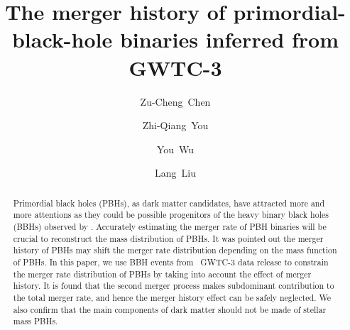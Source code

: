 \documentclass[
reprint,           %
superscriptaddress,%
amsmath,           %
amssymb,           %
aps,               %
prd,               %
notitlepage,       %
longbibliography,  %
floatfix,          %
showkeys,          %
]{revtex4-1}
\begin{document}
	
\title{The merger history of primordial-black-hole binaries inferred from GWTC-3}
	
\author{Zu-Cheng~Chen}

\author{Zhi-Qiang~You}

\author{You~Wu}

\author{Lang~Liu}

	

	
\begin{abstract}
Primordial black holes (PBHs), as dark matter candidates, have attracted 
more and more attentions as they could be possible progenitors of 
the heavy binary black holes (BBHs) observed by \lvc.
Accurately estimating the merger rate of PBH binaries will be crucial to
reconstruct the mass distribution of PBHs.
It was pointed out the merger history of PBHs may shift the merger rate distribution depending on the mass function of PBHs.
In this paper, we use BBH events from \lvc\ GWTC-3 data release to
constrain the merger rate distribution of PBHs by taking into account the effect of merger history.
It is found that the second merger process makes subdominant contribution to the 
total merger rate, and hence the merger history effect can be safely neglected.	
We also confirm that the main components of dark matter should not be made of stellar 
mass PBHs.

\end{abstract}
\end{document}
